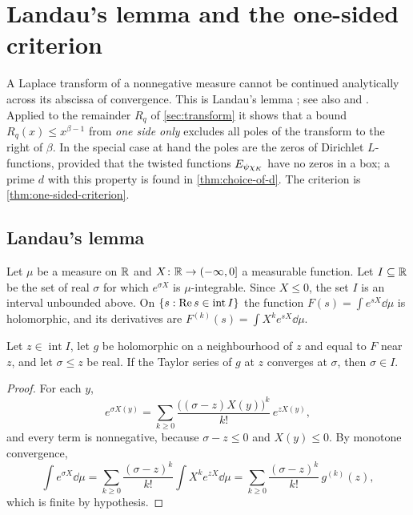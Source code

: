 \section{Landau's lemma and the one-sided criterion}\label{sec:criterion}

A Laplace transform of a nonnegative measure cannot be continued analytically across its abscissa
of convergence. This is Landau's lemma \cite{Landau1905}; see also
\cite[Lemma~15.1]{MontgomeryVaughan2007} and \cite[Ch.~II, Thm.~5b]{Widder1941}. Applied to the
remainder $R_q$ of \cref{sec:transform} it shows that a bound $R_q(x)\le x^{\beta-1}$ from
\emph{one side only} excludes all poles of the transform to the right of $\beta$. In the special case
at hand the poles are the zeros of Dirichlet $L$-functions, provided that the twisted functions
$E_{\psi\chi_K}$ have no zeros in a box; a prime $d$ with this property is found in
\cref{thm:choice-of-d}. The criterion is \cref{thm:one-sided-criterion}.

\subsection{Landau's lemma}\label{ss:landau}
Let $\mu$ be a measure on $\mathbb{R}$ and $X\colon\mathbb{R}\to(-\infty,0]$ a measurable function. Let
$I\subseteq\mathbb{R}$ be the set of real $\sigma$ for which $e^{\sigma X}$ is $\mu$-integrable. Since
$X\le0$, the set $I$ is an interval unbounded above. On $\{s:\operatorname{Re} s\in\operatorname{int}I\}$ the
function $F(s)=\int e^{sX}\dd\mu$ is holomorphic, and its derivatives are
$F^{(k)}(s)=\int X^ke^{sX}\dd\mu$.

\begin{lemma}\label{lem:landau-taylor}
Let $z\in\operatorname{int}I$, let $g$ be holomorphic on a neighbourhood of $z$ and equal to $F$
near $z$, and let $\sigma\le z$ be real. If the Taylor series of $g$ at $z$ converges at $\sigma$,
then $\sigma\in I$.
\end{lemma}

\begin{proof}
For each $y$,
\[
  e^{\sigma X(y)}=\sum_{k\ge0}\frac{\bigl((\sigma-z)X(y)\bigr)^k}{k!}\,e^{zX(y)},
\]
and every term is nonnegative, because $\sigma-z\le0$ and $X(y)\le0$. By monotone convergence,
\[
  \int e^{\sigma X}\dd\mu=\sum_{k\ge0}\frac{(\sigma-z)^k}{k!}\int X^ke^{zX}\dd\mu
  =\sum_{k\ge0}\frac{(\sigma-z)^k}{k!}\,g^{(k)}(z),
\]
which is finite by hypothesis.
\end{proof}

